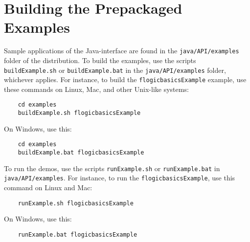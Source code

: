 \section{Building the Prepackaged Examples}

Sample applications of the Java-\FLSYSTEM interface
are found in the {\tt java/API/examples}  folder of the \FLSYSTEM
distribution.
To build the examples, use the scripts
{\tt buildExample.sh} or  {\tt buildExample.bat} in the {\tt java/API/examples}
folder, whichever applies. For instance, to
build the {\tt flogicbasicsExample} example, use these commands on Linux,
Mac, and other Unix-like systems:
\begin{verbatim}
    cd examples
    buildExample.sh flogicbasicsExample
\end{verbatim}
On Windows, use this:
\begin{verbatim}
    cd examples
    buildExample.bat flogicbasicsExample
\end{verbatim}

To run the demos, use the scripts
{\tt runExample.sh} or  {\tt runExample.bat}  in {\tt java/API/examples}.
For instance, to
run the {\tt flogicbasicsExample},  use this command on Linux and Mac:
\begin{verbatim}
    runExample.sh flogicbasicsExample
\end{verbatim}
On Windows, use this:
\begin{verbatim}
    runExample.bat flogicbasicsExample
\end{verbatim}


